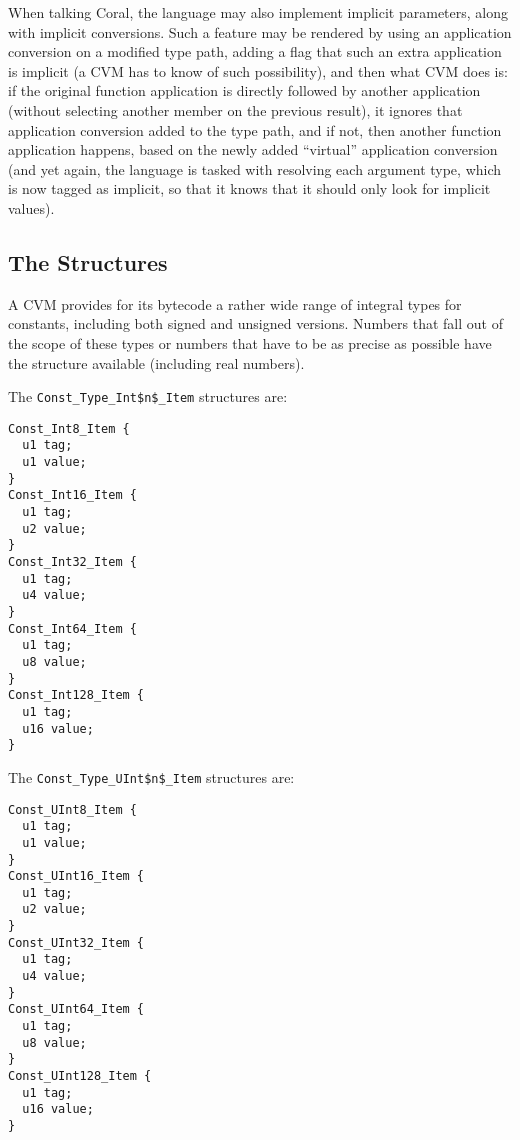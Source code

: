 When talking Coral, the language may also implement implicit parameters, along with implicit conversions. Such a feature may be rendered by using an application conversion on a modified type path, adding a flag that such an extra application is implicit (a CVM has to know of such possibility), and then what CVM does is: if the original function application is directly followed by another application (without selecting another member on the previous result), it ignores that application conversion added to the type path, and if not, then another function application happens, based on the newly added ``virtual'' application conversion (and yet again, the language is tasked with resolving each argument type, which is now tagged as implicit, so that it knows that it should only look for implicit values). 






\subsection{The  Structures}

A CVM provides for its bytecode a rather wide range of integral types for constants, including both signed and unsigned versions. Numbers that fall out of the scope of these types or numbers that have to be as precise as possible have the  structure available (including real numbers).

The \lstinline!Const_Type_Int$n$_Item! structures are:

\begin{minipage}{\linewidth}
\begin{lstlisting}
Const_Int8_Item {
  u1 tag;
  u1 value;
}
Const_Int16_Item {
  u1 tag;
  u2 value;
}
Const_Int32_Item {
  u1 tag;
  u4 value;
}
Const_Int64_Item {
  u1 tag;
  u8 value;
}
Const_Int128_Item {
  u1 tag;
  u16 value;
}
\end{lstlisting}
\end{minipage}

The \lstinline!Const_Type_UInt$n$_Item! structures are:

\begin{minipage}{\linewidth}
\begin{lstlisting}
Const_UInt8_Item {
  u1 tag;
  u1 value;
}
Const_UInt16_Item {
  u1 tag;
  u2 value;
}
Const_UInt32_Item {
  u1 tag;
  u4 value;
}
Const_UInt64_Item {
  u1 tag;
  u8 value;
}
Const_UInt128_Item {
  u1 tag;
  u16 value;
}
\end{lstlisting}
\end{minipage}

